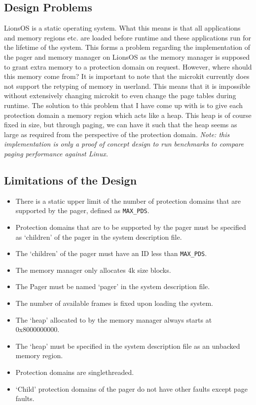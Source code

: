 \documentclass{article}
\begin{document}
\subsection{Design Problems}
LionsOS is a static operating system. What this means is that all applications and memory regions etc. are loaded before runtime and these applications run for the lifetime of the system. This forms a problem regarding the implementation of the pager and memory manager on LionsOS as the memory manager is supposed to grant extra memory to a protection domain on request. However, where should this memory come from? It is important to note that the microkit currently does not support the retyping of memory in userland. This means that it is impossible without extensively changing microkit to even change the page tables during runtime. The solution to this problem that I have come up with is to give each protection domain a memory region which acts like a heap. This heap is of course fixed in size, but through paging, we can have it such that the heap seems as large as required from the perspective of the protection domain. \textit{Note: this implementation is only a proof of concept design to run benchmarks to compare paging performance against Linux.}
\subsection{Limitations of the Design}
\begin{itemize}
    \item There is a static upper limit of the number of protection domains that are supported by the pager, defined as \texttt{MAX\_PDS}.
    \item Protection domains that are to be supported by the pager must be specified as `children' of the pager in the system description file.
    \item The `children' of the pager must have an ID less than \texttt{MAX\_PDS}.
    \item The memory manager only allocates 4k size blocks.
    \item The Pager must be named `pager' in the system description file.
    \item The number of available frames is fixed upon loading the system.
    \item The `heap' allocated to by the memory manager always starts at 0x8000000000.
    \item The `heap' must be specified in the system description file as an unbacked memory region. 
    \item Protection domains are singlethreaded.
    \item `Child' protection domains of the pager do not have other faults except page faults. 
\end{itemize} 
\end{document}

